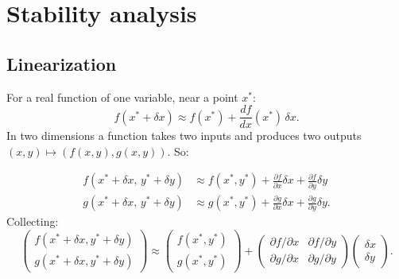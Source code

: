 \section{Stability analysis}

\subsection{Linearization}

For a real function of one variable, near a point $x^*$:
\[
f(x^*+\delta x) \approx f(x^*) + \frac{df}{dx}(x^*)\,\delta x.
\]
In two dimensions a function takes two inputs and produces two
outputs $(x,y)\mapsto (f(x,y),g(x,y))$. So:

\begin{align*}
f(x^*+\delta x,\,y^*+\delta y) &\approx f(x^*,y^*) + \frac{\partial f}{\partial x}\delta x + \frac{\partial f}{\partial y}\delta y \\
g(x^*+\delta x,\,y^*+\delta y) &\approx g(x^*,y^*) + \frac{\partial g}{\partial x}\delta x + \frac{\partial g}{\partial y}\delta y.
\end{align*}
Collecting:
\[
\begin{pmatrix} f(x^*+\delta x,y^*+\delta y) \\ g(x^*+\delta x,y^*+\delta y) \end{pmatrix}
\approx
\begin{pmatrix} f(x^*,y^*) \\ g(x^*,y^*) \end{pmatrix}
+
\begin{pmatrix} \partial f/\partial x & \partial f/\partial y \\ \partial g/\partial x & \partial g/\partial y \end{pmatrix}
\begin{pmatrix} \delta x \\ \delta y \end{pmatrix}.
\]

